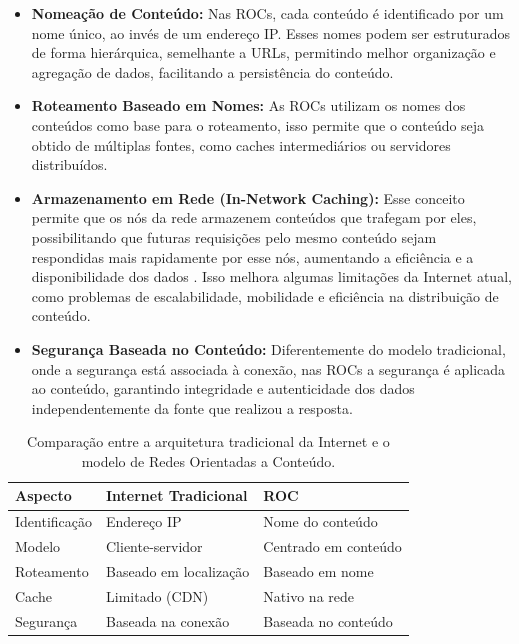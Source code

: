 \documentclass[12pt]{article}
\begin{document}
\begin{itemize}
\item \textbf{Nomeação de Conteúdo:}
Nas ROCs, cada conteúdo é identificado por um nome único, ao invés de um endereço IP. Esses nomes podem ser estruturados de forma hierárquica, semelhante a URLs, permitindo melhor organização e agregação de dados, facilitando a persistência do conteúdo.

\item \textbf{Roteamento Baseado em Nomes:}
As ROCs utilizam os nomes dos conteúdos como base para o roteamento, isso permite que o conteúdo seja obtido de múltiplas fontes, como caches intermediários ou servidores distribuídos.

\item \textbf{Armazenamento em Rede (In-Network Caching):}
Esse conceito permite que os nós da rede armazenem conteúdos que trafegam por eles, possibilitando que futuras requisições pelo mesmo conteúdo sejam respondidas mais rapidamente por esse nós, aumentando a eficiência e a disponibilidade dos dados \cite{bvm12}. Isso melhora algumas limitações da Internet atual, como problemas de escalabilidade, mobilidade e eficiência na distribuição de conteúdo.

\item \textbf{Segurança Baseada no Conteúdo:}
Diferentemente do modelo tradicional, onde a segurança está associada à conexão, nas ROCs a segurança é aplicada ao conteúdo, garantindo integridade e autenticidade dos dados independentemente da fonte que realizou a resposta.

\end{itemize}
\begin{table}[htbp]
\centering
\caption{Comparação entre a arquitetura tradicional da Internet e o modelo de Redes Orientadas a Conteúdo.}
\label{tab:comparacao}
\begin{tabular}{|l|l|l|}
\hline
\textbf{Aspecto} & \textbf{Internet Tradicional} & \textbf{ROC} \\ \hline
Identificação & Endereço IP & Nome do conteúdo \\ \hline
Modelo & Cliente-servidor & Centrado em conteúdo \\ \hline
Roteamento & Baseado em localização & Baseado em nome \\ \hline
Cache & Limitado (CDN) & Nativo na rede \\ \hline
Segurança & Baseada na conexão & Baseada no conteúdo \\ \hline
\end{tabular}
\end{table}
\end{document}
